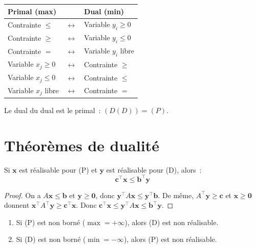 \begin{formules}[title=\textbf{R\`egles de construction du dual}]
\begin{center}
\renewcommand{\arraystretch}{1.3}
\begin{tabular}{lll}
  \toprule
  \textbf{Primal (max)} & & \textbf{Dual (min)} \\
  \midrule
  Contrainte $\le$ & $\leftrightarrow$ & Variable $y_i \ge 0$ \\
  Contrainte $\ge$ & $\leftrightarrow$ & Variable $y_i \le 0$ \\
  Contrainte $=$ & $\leftrightarrow$ & Variable $y_i$ libre \\
  Variable $x_j \ge 0$ & $\leftrightarrow$ & Contrainte $\ge$ \\
  Variable $x_j \le 0$ & $\leftrightarrow$ & Contrainte $\le$ \\
  Variable $x_j$ libre & $\leftrightarrow$ & Contrainte $=$ \\
  \bottomrule
\end{tabular}
\end{center}
\end{formules}

\begin{remarque}
Le dual du dual est le primal~: $(D(D)) = (P)$.
\end{remarque}

\section{Th\'eor\`emes de dualit\'e}

\begin{theoreme}
\label{thm:dualite_faible}
Si $\mathbf{x}$ est r\'ealisable pour (P) et $\mathbf{y}$ est r\'ealisable
pour (D), alors~:
\[
  \mathbf{c}^\top \mathbf{x} \le \mathbf{b}^\top \mathbf{y}
\]
\end{theoreme}

\begin{proof}
On a $A\mathbf{x} \le \mathbf{b}$ et $\mathbf{y} \ge \mathbf{0}$, donc
$\mathbf{y}^\top A\mathbf{x} \le \mathbf{y}^\top \mathbf{b}$.  De m\^eme,
$A^\top\mathbf{y} \ge \mathbf{c}$ et $\mathbf{x} \ge \mathbf{0}$ donnent
$\mathbf{x}^\top A^\top\mathbf{y} \ge \mathbf{c}^\top\mathbf{x}$.  Donc
$\mathbf{c}^\top\mathbf{x} \le \mathbf{y}^\top A\mathbf{x} \le
\mathbf{b}^\top\mathbf{y}$.
\end{proof}

\begin{corollaire}[Bornes]
\begin{enumerate}
  \item Si (P) est non born\'e ($\max = +\infty$), alors (D) est non
        r\'ealisable.
  \item Si (D) est non born\'e ($\min = -\infty$), alors (P) est non
        r\'ealisable.
\end{enumerate}
\end{corollaire}

